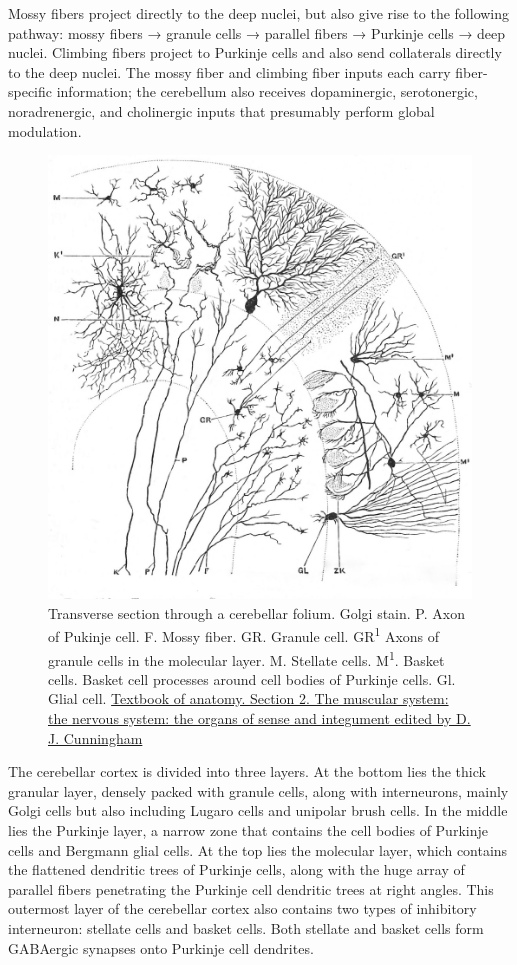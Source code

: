 Mossy fibers project directly to the deep nuclei, but also give rise to the following pathway: mossy fibers → granule cells → parallel fibers → Purkinje cells → deep nuclei. Climbing fibers project to Purkinje cells and also send collaterals directly to the deep nuclei. The mossy fiber and climbing fiber inputs each carry fiber-specific information; the cerebellum also receives dopaminergic, serotonergic, noradrenergic, and cholinergic inputs that presumably perform global modulation.



\begin{figure}

{\centering \includegraphics[width=0.7\linewidth]{./figures/cns/cerebellar_folium} 

}

\caption{Transverse section through a cerebellar folium. Golgi stain. P. Axon of Pukinje cell. F. Mossy fiber. GR. Granule cell. GR\textsuperscript{1} Axons of granule cells in the molecular layer. M. Stellate cells. M\textsuperscript{1}. Basket cells. Basket cell processes around cell bodies of Purkinje cells. Gl. Glial cell. \href{https://wellcomelibrary.org/item/b21271070}{Textbook of anatomy. Section 2. The muscular system: the nervous system: the organs of sense and integument edited by D. J. Cunningham}}\label{fig:cerebellumfolium}
\end{figure}

The cerebellar cortex is divided into three layers. At the bottom lies the thick granular layer, densely packed with granule cells, along with interneurons, mainly Golgi cells but also including Lugaro cells and unipolar brush cells. In the middle lies the Purkinje layer, a narrow zone that contains the cell bodies of Purkinje cells and Bergmann glial cells. At the top lies the molecular layer, which contains the flattened dendritic trees of Purkinje cells, along with the huge array of parallel fibers penetrating the Purkinje cell dendritic trees at right angles. This outermost layer of the cerebellar cortex also contains two types of inhibitory interneuron: stellate cells and basket cells. Both stellate and basket cells form GABAergic synapses onto Purkinje cell dendrites.

